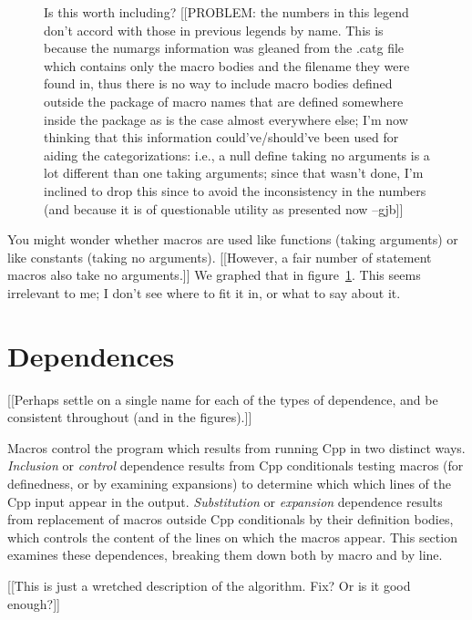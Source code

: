 \documentclass[10pt]{article}
\begin{document}
\begin{figure}
\centerline{}
\caption{Is this worth including?
  [[PROBLEM:  the numbers in this legend don't accord with those in
  previous legends by name.  This is because the numargs information was
  gleaned from the .catg file which contains only the macro bodies and
  the filename they were found in, thus there is no way to include macro
  bodies defined outside the package of macro names that are defined
  somewhere inside the package as is the case almost everywhere else;
  I'm now thinking that this information could've/should've been used
  for aiding the categorizations: i.e., a null define taking no
  arguments is a lot different than one taking arguments;  since that
  wasn't done, I'm inclined to drop this since to avoid the
  inconsistency in the numbers (and because it is of questionable
  utility as presented now --gjb]]}
\label{fig:cat-numargs}
\end{figure}


You might wonder whether macros are used like functions (taking arguments)
or like constants (taking no arguments).  
[[However, a fair number of statement macros also take no arguments.]]
We graphed that in
figure~\ref{fig:cat-numargs}.  This seems irrelevant to me; I don't see
where to fit it in, or what to say about it.



\section{Dependences}
\label{sec:dependence}
\label{sec:last-content-section}

[[Perhaps settle on a single name for each of the types of dependence, and
be consistent throughout (and in the figures).]]

Macros control the program which results from running Cpp in two
distinct ways.  {\em Inclusion} or {\em control} dependence results from
Cpp conditionals testing macros (for definedness, or by examining
expansions) to determine which which lines of the Cpp input appear in
the output.  {\em Substitution} or {\em expansion} dependence results
from replacement of macros outside Cpp conditionals by their definition
bodies, which controls the content of the lines on which the macros
appear. This section examines these dependences, breaking them down both
by macro and by line.

[[This is just a wretched description of the algorithm.  Fix?  Or is it
good enough?]]
\end{document}
